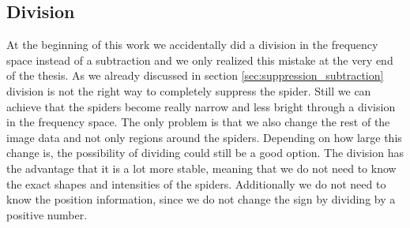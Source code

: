 \subsection{Division}
\label{sec:suppression_division}
At the beginning of this work we accidentally did a division in the frequency space instead of a subtraction and we only realized this mistake at the very end of the thesis. As we already discussed in section \ref{sec:suppression_subtraction} division is not the right way to completely suppress the spider. Still we can achieve that the spiders become really narrow and less bright through a division in the frequency space. The only problem is that we also change the rest of the image data and not only regions around the spiders. Depending on how large this change is, the possibility of dividing could still be a good option. The division has the advantage that it is a lot more stable, meaning that we do not need to know the exact shapes and intensities of the spiders. Additionally we do not need to know the position information, since we do not change the sign by dividing by a positive number. \\

